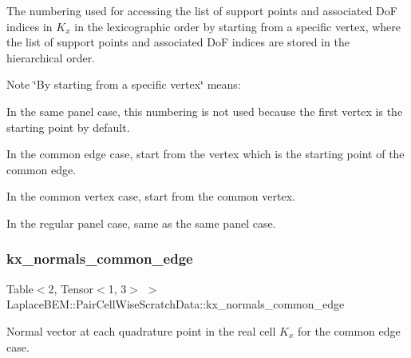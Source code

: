 The numbering used for accessing the list of support points and associated DoF indices in $K_x$ in the lexicographic order by starting from a specific vertex, where the list of support points and associated DoF indices are stored in the hierarchical order.


\begin{DoxyDescription}
\item[Note ]\char`\"{}\+By starting from a specific vertex\char`\"{} means\+:
\begin{DoxyEnumerate}
\item In the same panel case, this numbering is not used because the first vertex is the starting point by default.
\item In the common edge case, start from the vertex which is the starting point of the common edge.
\item In the common vertex case, start from the common vertex.
\item In the regular panel case, same as the same panel case. 
\end{DoxyEnumerate}
\end{DoxyDescription}\mbox{\label{structLaplaceBEM_1_1PairCellWiseScratchData_a281bd24bb9cc4f052e72436287d3020e}} 
\subsubsection{\texorpdfstring{kx\+\_\+normals\+\_\+common\+\_\+edge}{kx\_normals\_common\_edge}}
{\footnotesize\ttfamily Table$<$2, Tensor$<$1, 3$>$ $>$ Laplace\+B\+E\+M\+::\+Pair\+Cell\+Wise\+Scratch\+Data\+::kx\+\_\+normals\+\_\+common\+\_\+edge}

Normal vector at each quadrature point in the real cell $K_x$ for the common edge case. \mbox{\label{structLaplaceBEM_1_1PairCellWiseScratchData_a9f8757bdb93eb794fa85740c9803de81}} 

